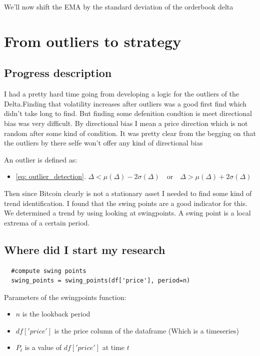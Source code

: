 \documentclass[12pt]{article}
\begin{document}
We'll now shift the EMA by the standard deviation of the orderbook delta 




\newpage
\section{From outliers to strategy}
\subsection{Progress description}
I had a pretty hard time going from developing a logic for the outliers of the Delta.Finding that volatility increases after outliers was a good first find which didn't take long to find. But finding some defenition condtion is meet directional bias was very difficult. By directional bias I mean a price direction which is not random after some kind of condition. It was pretty clear from the begging on that the outliers by there selfe won't offer any kind of directional bias


An outlier is defined as:

\begin{itemize}
  \item \eqref{eq: outlier_detection}.
  $\Delta < \mu(\Delta) - 2\sigma(\Delta) \quad \text{or} \quad \Delta > \mu(\Delta) + 2\sigma(\Delta)    $
\end{itemize}


Then since Bitcoin clearly is not a stationary asset I needed to find some kind of trend identification. I found that the swing points are a good indicator for this.
We determined a trend by using looking at swingpoints. A swing point is a local extrema of a certain period.

\subsection{Where did I start my research}
\begin{verbatim}
  #compute swing points
  swing_points = swing_points(df['price'], period=n)

\end{verbatim}

Parameters of the swing\textunderscore points function:
\begin{itemize}
  \item $n$ is the lookback period
  \item $df['price']$ is the price column of the dataframe (Which is a timeseries)
  \item $P_t$ is a value of $df['price']$ at time $t$
\end{itemize}
\end{document}

